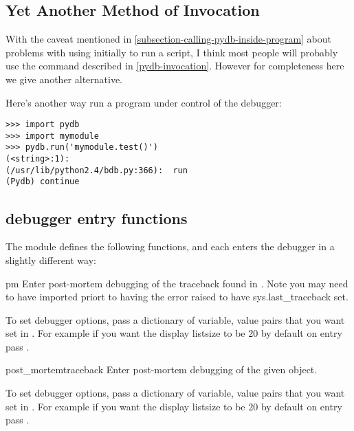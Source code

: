 \subsection{Yet Another Method of Invocation}

With the caveat mentioned in
\ref{subsection-calling-pydb-inside-program} about problems with using
 initially to run a script, I think most people will
probably use the  command described in
\ref{pydb-invocation}. However for completeness here we give another
alternative.

Here's another way run a program under control of the debugger:

\begin{verbatim}
>>> import pydb
>>> import mymodule
>>> pydb.run('mymodule.test()')
(<string>:1): 
(/usr/lib/python2.4/bdb.py:366):  run
(Pydb) continue
\end{verbatim}

\subsection{debugger entry functions}

The  module defines the following functions, and each enters
the debugger in a slightly different way:

\begin{funcdesc}{pm}{}
Enter post-mortem debugging of the traceback found in
. Note you may need to have 
imported priort to having the error raised to have sys.last_traceback
set.

To set debugger options, pass a dictionary of variable, value pairs
that you want set in . For example if you want
the display listsize to be 20 by default on entry pass
.
\end{funcdesc}

\begin{funcdesc}{post_mortem}{traceback}
Enter post-mortem debugging of the given  object.

To set debugger options, pass a dictionary of variable, value pairs
that you want set in . For example if you want
the display listsize to be 20 by default on entry pass
.

\end{funcdesc}

